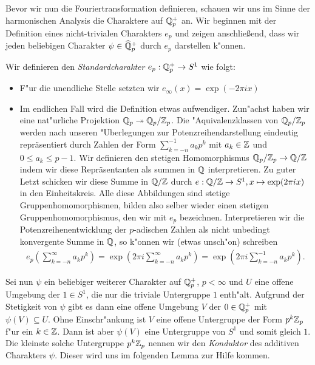 		
		Bevor wir nun die Fouriertransformation definieren, schauen wir uns im Sinne der harmonischen Analysis die Charaktere auf $\mathbb{Q}_p^+$ an.
		Wir beginnen mit der Definition eines nicht-trivialen Charakters $e_p$ und zeigen anschließend, dass wir jeden beliebigen Charakter $\psi \in \widehat{\mathbb{Q}}_p^+$ durch $e_p$ darstellen k"onnen.
		\begin{defi}
			Wir definieren den \emph{Standardcharakter} $e_p:\mathbb{Q}_p^+ \to S^1$ wie folgt:
			\begin{itemize}%
				\item F"ur die unendliche Stelle setzten wir $e_\infty(x) = \exp(-2\pi i x)$
				\item Im endlichen Fall wird die Definition etwas aufwendiger. Zun"achst haben wir eine nat"urliche Projektion ${\mathbb{Q}_p} \twoheadrightarrow {\mathbb{Q}_p}/{\mathbb{Z}_p}$.
				Die "Aquivalenzklassen von ${\mathbb{Q}_p}/{\mathbb{Z}_p}$ werden nach unseren "Uberlegungen zur Potenzreihendarstellung eindeutig repräsentiert durch Zahlen der Form $\sum_{k=-n}^{-1} a_kp^k$ mit $a_k \in \mathbb{Z}$ und $0\leq a_k\leq p-1$.
				Wir definieren den stetigen Homomorphismus ${\mathbb{Q}_p}/{\mathbb{Z}_p} \to \mathbb{Q}/\mathbb{Z}$ indem wir diese Repräsentanten als summen in $\mathbb{Q}$ interpretieren. 
				Zu guter Letzt schicken wir diese Summe in $\mathbb{Q}/\mathbb{Z}$ durch $e: \mathbb{Q}/\mathbb{Z} \to S^1, x \mapsto \exp(2\pi i x)$ in den Einheitskreis. 
				Alle diese Abbildungen sind stetige Gruppenhomomorphismen, bilden also selber wieder einen stetigen Gruppenhomomorphismus, den wir mit $e_p$ bezeichnen.
				Interpretieren wir die Potenzreihenentwicklung der $p$-adischen Zahlen als nicht unbedingt konvergente Summe in $\mathbb{Q}$, so k"onnen wir (etwas unsch"on) schreiben
				\begin{align*}
					e_p\left(\sum_{k=-n}^{\infty} a_kp^k\right) = \exp\left(2\pi i \sum_{k=-n}^{\infty} a_kp^k\right) = \exp\left(2\pi i \sum_{k=-n}^{-1} a_kp^k\right).
				\end{align*}
			\end{itemize}
		\end{defi}
		Sei nun $\psi$ ein beliebiger weiterer Charakter auf $\mathbb{Q}_p^+$, $p<\infty$ und $U$ eine offene Umgebung der $1 \in S^1$, die nur die triviale Untergruppe $1$ enth"alt. 
		Aufgrund der Stetigkeit von $\psi$ gibt es dann eine offene Umgebung $V$ der $0\in\mathbb{Q}_p^+$ mit $\psi(V)\subseteq U$. 
		Ohne Einschr"ankung ist $V$ eine offene Untergruppe der Form $p^k{\mathbb{Z}_p}$ f"ur ein $k\in\mathbb{Z}$. 
		Dann ist aber $\psi(V)$ eine Untergruppe von $S^1$ und somit gleich $1$.
		Die kleinste solche Untergruppe $p^k{\mathbb{Z}_p}$ nennen wir den \emph{Konduktor} des additiven Charakters $\psi$.
		Dieser wird uns im folgenden Lemma zur Hilfe kommen.
	

